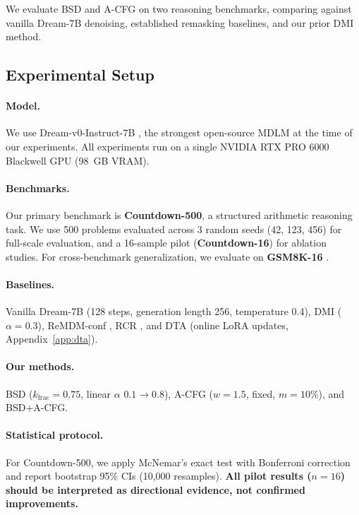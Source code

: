 \documentclass{article}
\begin{document}
We evaluate BSD and A-CFG on two reasoning benchmarks, comparing against vanilla Dream-7B denoising, established remasking baselines, and our prior DMI method.

\subsection{Experimental Setup}

\paragraph{Model.} We use Dream-v0-Instruct-7B \citep{liu2025dream}, the strongest open-source MDLM at the time of our experiments. All experiments run on a single NVIDIA RTX PRO 6000 Blackwell GPU (98~GB VRAM).

\paragraph{Benchmarks.} Our primary benchmark is \textbf{Countdown-500}, a structured arithmetic reasoning task. We use 500 problems evaluated across 3 random seeds (42, 123, 456) for full-scale evaluation, and a 16-sample pilot (\textbf{Countdown-16}) for ablation studies. For cross-benchmark generalization, we evaluate on \textbf{GSM8K-16} \citep{cobbe2021gsm8k}.

\paragraph{Baselines.} Vanilla Dream-7B (128 steps, generation length 256, temperature 0.4), DMI ($\alpha{=}0.3$), ReMDM-conf \citep{arriola2025remdm}, RCR \citep{ye2025rcr}, and DTA (online LoRA updates, Appendix~\ref{app:dta}).

\paragraph{Our methods.} BSD ($k_\text{frac}{=}0.75$, linear $\alpha$ $0.1{\to}0.8$), A-CFG ($w{=}1.5$, fixed, $m{=}10\%$), and BSD+A-CFG.

\paragraph{Statistical protocol.} For Countdown-500, we apply McNemar's exact test with Bonferroni correction and report bootstrap 95\% CIs (10,000 resamples). \textbf{All pilot results ($n = 16$) should be interpreted as directional evidence, not confirmed improvements.}
\end{document}

